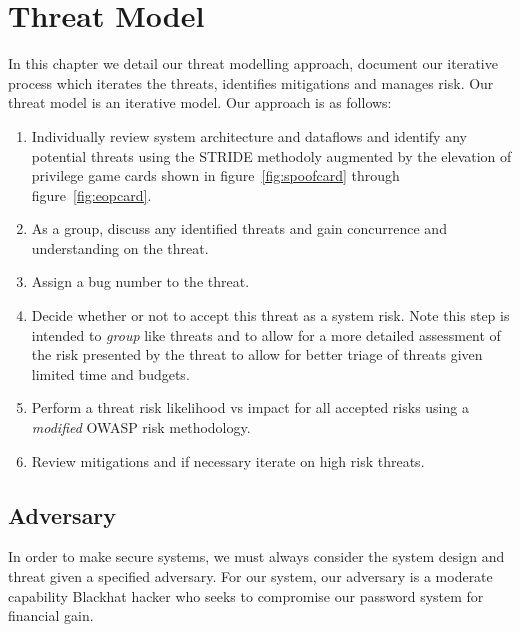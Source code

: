 \chapter{Threat Model}
\label{ch:threatmodel}
In this chapter we detail our threat modelling approach, document our iterative process which iterates the threats, identifies mitigations and manages risk.  Our threat model is an iterative model.  Our approach is as follows:
\begin{enumerate}
    \item{Individually review system architecture and dataflows and identify any potential threats using the STRIDE methodoly augmented by the elevation of privilege game cards shown in figure~\ref{fig:spoofcard} through figure~\ref{fig:eopcard}.}
    \item{As a group, discuss any identified threats and gain concurrence and understanding on the threat.}
    \item{Assign a bug number to the threat.}
    \item{Decide whether or not to accept this threat as a system risk.  Note this step is intended to \emph{group} like threats and to allow for a more detailed assessment of the risk presented by the threat to allow for better triage of threats given limited time and budgets.}
    \item{Perform a threat risk likelihood vs impact for all accepted risks using a \emph{modified} OWASP risk methodology.}
    \item{Review mitigations and if necessary iterate on high risk threats.}
\end{enumerate}


\section{Adversary}
\label{sec:adversary}
In order to make secure systems, we must always consider the system design and threat given a specified adversary.  For our system, our adversary is a moderate capability Blackhat hacker who seeks to compromise our password system for financial gain.  

